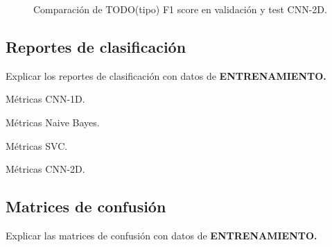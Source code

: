     \begin{figure}[h]
        \centering
        
        \caption{Comparación de TODO(tipo) F1 score en validación y test CNN-2D.}
        \label{F1Score2DImage}
     \end{figure}


  \subsection{Reportes de clasificación}
       
    Explicar los reportes de clasificación con datos de \textbf{ENTRENAMIENTO.}

      \begin{table}[H]
        \centering
        \caption{Métricas CNN-1D.}
        \label{CNN1DMetrics}
      \end{table}

      \begin{table}[H]
        \centering
        \caption{Métricas Naive Bayes.}
        \label{NBMetrics}
      \end{table}

      \begin{table}[H]
        \centering
        \caption{Métricas SVC.}
        \label{SVCDMetrics}
      \end{table}

      \begin{table}[H]
        \centering
        \caption{Métricas CNN-2D.}
        \label{CNN2DMetrics}
      \end{table}


  \subsection{Matrices de confusión}

    Explicar las matrices de confusión con datos de \textbf{ENTRENAMIENTO.}

